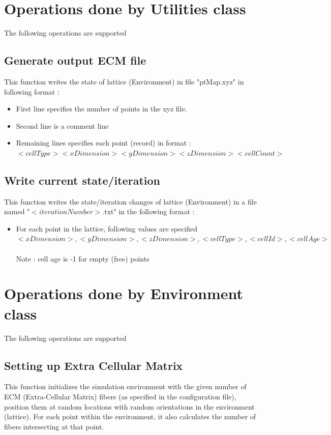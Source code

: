 \documentclass[11pt]{report}
\begin{document}
  \section{\color{red} Operations done by Utilities class}
  The following operations are supported
  \subsection{\color{blue}Generate output ECM file}
  This function writes the state of lattice (Environment) in file "ptMap.xyz" in following format : \\
  \begin{itemize}
    \item First line specifies the number of points in the xyz file.
    \item Second line is a comment line
    \item Remaining lines specifies each point (record) in format : \\
    $<cell Type> <x Dimension> <y Dimension> <z Dimension> <cell Count>$
   \end{itemize}
   \subsection{\color{blue}Write current state/iteration}
   This function writes the state/iteration changes of lattice (Environment) in a file named "$<iterationNumber>$.txt" in the following format :
   \begin{itemize}
    \item For each point in the lattice, following values are specified \\
    $<x Dimension>,<y Dimension>,<z Dimension>,<cell Type>,<cell Id>,<cell Age>$ \\ \\
    Note : cell age is -1 for empty (free) points 
   \end{itemize}
   
  \section{\color{red} Operations done by Environment class}
  The following operations are supported
  \subsection{\color{blue}Setting up Extra Cellular Matrix}
  This function initializes the simulation environment with the given number of ECM (Extra-Cellular Matrix) fibers (as specified in the configuration file), position them at random locations with random orientations in the environment (lattice).
  For each point within the environment, it also calculates the number of fibers intersecting at that point.
\end{document}
